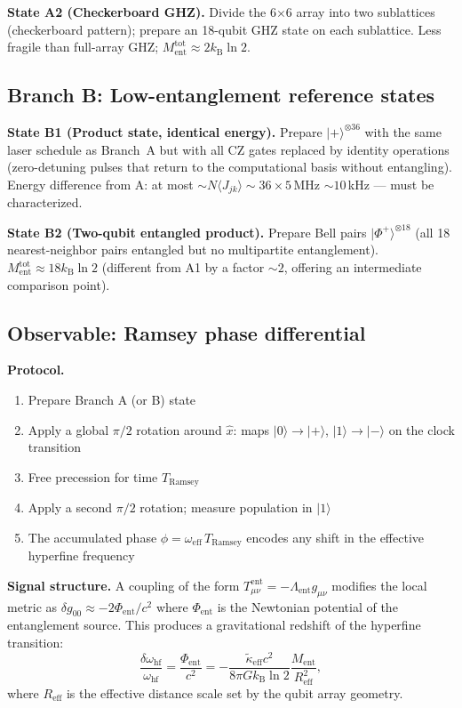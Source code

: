 \documentclass[12pt,letterpaper]{article}
\theoremstyle{plain}
\theoremstyle{definition}
\theoremstyle{remark}
\newcommand{\kB}{k_{\mathrm{B}}}
\newcommand{\kteff}{\tilde{\kappa}_{\mathrm{eff}}}
\newcommand{\Ment}{M_{\mathrm{ent}}}
\begin{document}
\textbf{State A2 (Checkerboard GHZ).}  Divide the 6$\times$6 array into two sublattices
(checkerboard pattern); prepare an 18-qubit GHZ state on each sublattice.
Less fragile than full-array GHZ; $\Ment^{\mathrm{tot}} \approx 2\kB\ln 2$.

\subsection{Branch B: Low-entanglement reference states}

\textbf{State B1 (Product state, identical energy).}
Prepare $|+\rangle^{\otimes 36}$ with the same laser schedule as Branch~A but with all
CZ gates replaced by identity operations (zero-detuning pulses that return to the
computational basis without entangling).  Energy difference from A: at most
$\sim N\langle J_{jk}\rangle \sim 36 \times 5$\,MHz $\sim 10$\,kHz --- must be characterized.

\textbf{State B2 (Two-qubit entangled product).}
Prepare Bell pairs $|\Phi^+\rangle^{\otimes 18}$ (all 18 nearest-neighbor pairs
entangled but no multipartite entanglement).  $\Ment^{\mathrm{tot}} \approx 18\kB\ln 2$
(different from A1 by a factor $\sim 2$, offering an intermediate comparison point).

\subsection{Observable: Ramsey phase differential}

\textbf{Protocol.}
\begin{enumerate}
  \item Prepare Branch A (or B) state
  \item Apply a global $\pi/2$ rotation around $\hat{x}$: maps $|0\rangle \to |+\rangle$,
    $|1\rangle \to |-\rangle$ on the clock transition
  \item Free precession for time $T_{\mathrm{Ramsey}}$
  \item Apply a second $\pi/2$ rotation; measure population in $|1\rangle$
  \item The accumulated phase $\phi = \omega_{\mathrm{eff}}\,T_{\mathrm{Ramsey}}$ encodes
    any shift in the effective hyperfine frequency
\end{enumerate}

\textbf{Signal structure.}  A coupling of the form $T^{\mathrm{ent}}_{\mu\nu} = -\Lambda_{\mathrm{ent}}g_{\mu\nu}$
modifies the local metric as $\delta g_{00} \approx -2\Phi_{\mathrm{ent}}/c^2$ where
$\Phi_{\mathrm{ent}}$ is the Newtonian potential of the entanglement source.  This produces
a gravitational redshift of the hyperfine transition:
\begin{equation}
  \frac{\delta\omega_{\mathrm{hf}}}{\omega_{\mathrm{hf}}}
  = \frac{\Phi_{\mathrm{ent}}}{c^2}
  = -\frac{\kteff c^2}{8\pi G\kB\ln 2}\frac{\Ment}{R_{\mathrm{eff}}^2},
  \label{eq:frequency-shift}
\end{equation}
where $R_{\mathrm{eff}}$ is the effective distance scale set by the qubit array geometry.
\end{document}
